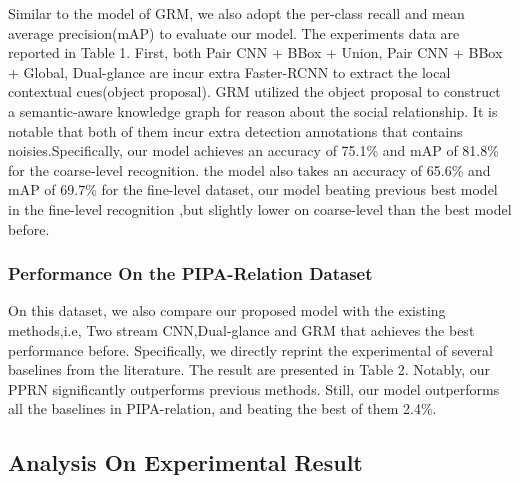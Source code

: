 \documentclass{article}
\newcommand{\PPRN}{{\sf PPRN}}
\begin{document}
Similar to the model of GRM, we also adopt the per-class recall and mean average precision(mAP) to evaluate our model. The experiments data are reported in Table 1. First, both Pair CNN + BBox + Union, Pair CNN + BBox + Global, Dual-glance are incur extra Faster-RCNN\cite{DBLP:conf/nips/RenHGS15} to extract the local contextual cues(object proposal). GRM utilized the object proposal to construct a semantic-aware  knowledge graph for reason about the social relationship. It is notable that both of them incur extra detection annotations that contains noisies.Specifically, our model achieves an accuracy of 75.1\% and mAP of 81.8\% for the coarse-level recognition. the model also takes an accuracy of 65.6\% and mAP of 69.7\% for the fine-level dataset, our model beating previous best model in the fine-level recognition ,but slightly lower on coarse-level than the best model before.

\subsubsection{Performance On the PIPA-Relation Dataset}

On this dataset, we also compare our proposed model with the existing methods,i.e, Two stream CNN\cite{DBLP:conf/cvpr/SunSF17},Dual-glance\cite{DBLP:conf/iccv/LiWZK17} and GRM\cite{DBLP:conf/ijcai/WangCRYCL18} that achieves the best performance before. Specifically, we directly reprint the experimental of several baselines from the literature. The result are presented in Table 2. Notably, our {\PPRN} significantly outperforms previous methods. Still, our model outperforms all the baselines in PIPA-relation, and beating the best of them 2.4\%.

\subsection{Analysis On Experimental Result}
\end{document}
